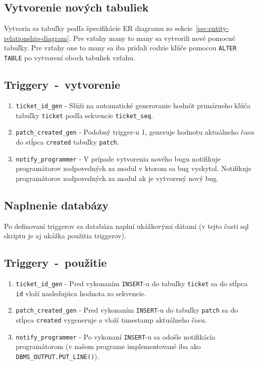 \documentclass[11pt, a4paper]{article}
\begin{document}
    \subsection{Vytvorenie nových tabuliek}\label{subsec:vytvorenie-nových-tabulieknull}

    Vytvoria sa tabuľky podľa špecifikácie ER diagramu zo sekcie~\ref{sec:entity-relationship-diagram}.
    Pre vzťahy many to many sa vytvorili nové pomocné tabuľky.
    Pre vzťahy one to many sa iba pridali codzie kľúče pomocou \texttt{ALTER TABLE} po vytvorení oboch tabuliek vzťahu.

    \subsection{Triggery\ -\ vytvorenie}\label{subsec:triggery}

    \begin{enumerate}
        \item \texttt{ticket\_id\_gen} -
        Slúži na automatické generovanie hodnôt primárneho kľúča tabuľky \texttt{ticket} podľa sekvencie \texttt{ticket\_seq}.
        \item \texttt{patch\_created\_gen} -
        Podobný trigger-u 1, generuje hodnotu aktuálneho času do stĺpca \texttt{created} tabuľky \texttt{patch}.
        \item \texttt{notify\_programmer} -
        V prípade vytvorenia nového bugu notifikuje programátorov zodpovedných za modul v ktorom sa bug vyskytol.
        Notifikuje programátorov zodpovedných za modul ak je vytvorený nový bug.
    \end{enumerate}

    \subsection{Naplnenie databázy}\label{subsec:naplnenie-databázy}

    Po definovaní triggerov sa databáza naplní ukážkovými dátami (v tejto časti sql skriptu je aj ukážka použitia triggerov).

    \subsection{Triggery\ -\ použitie}\label{subsec:triggery---použitie}

    \begin{enumerate}
        \item \texttt{ticket\_id\_gen} -
        Pred vykonaním \texttt{INSERT}-u do tabuľky \texttt{ticket} sa do stĺpca \texttt{id} vloží nasledujúca hodnota zo sekvencie.
        \item \texttt{patch\_created\_gen} -
        Pred vykonaním \texttt{INSERT}-u do tabuľky \texttt{patch} sa do stĺpca \texttt{created} vygeneruje a vloží timestamp aktuálneho času.
        \item \texttt{notify\_programmer} -
        Po vykonaní \texttt{INSERT}-u sa odošle notifikácia programátorom (v našom programe implementované iba ako \texttt{DBMS\_OUTPUT.PUT\_LINE()}).
    \end{enumerate}
\end{document}
